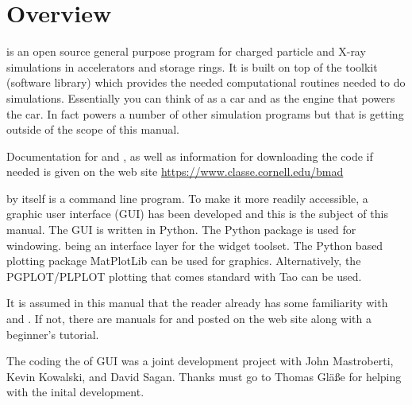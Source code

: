 \chapter{Overview}

\tao is an open source general purpose program for charged particle and X-ray simulations in
accelerators and storage rings. It is built on top of the \bmad toolkit (software library) which
provides the needed computational routines needed to do simulations. Essentially you can think of
\tao as a car and \bmad as the engine that powers the car. In fact \bmad powers a number of other
simulation programs but that is getting outside of the scope of this manual. 

Documentation for \bmad and \tao, as well as information for downloading the code if needed is given
on the \bmad web site
\hfill\break
\hspace*{0.3in} \url{https://www.classe.cornell.edu/bmad}

\tao by itself is a command line program. To make it more readily accessible, a graphic user
interface (GUI) has been developed and this is the subject of this manual. The GUI is written in
Python. The Python  package is used for windowing.  being an interface layer
for the  widget toolset. The Python based plotting package MatPlotLib can be used for graphics.
Alternatively, the PGPLOT/PLPLOT plotting that comes standard with Tao can be used.

It is assumed in this manual that the reader already has some familiarity with \bmad and \tao. If not,
there are manuals for \bmad and \tao posted on the \bmad web site along with a beginner's tutorial.

The coding the of GUI was a joint development project with John Mastroberti, Kevin Kowalski, and
David Sagan. Thanks must go to Thomas Gl{\"a}{\ss}e for helping with the inital development.


